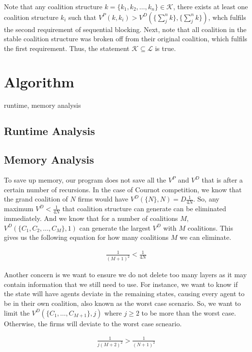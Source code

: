 \documentclass[sigconf,anonymous]{aamas}
\newcommand{\ykc}[1]{{\color{blue} #1}}
\begin{document}
Note that any coalition structure $k=\{k_1, k_2, \dots, k_n\} \in \mathcal{K}$, there exists at least one coalition structure $k_i$ such that $V^P(k, k_i) > V^D(\{\sum_j^n k\}, \{\sum_j^n k\})$, whch fulfils the second requirement of sequential blocking. Next, note that all coalition in the stable coalition structure was broken off from their original coalition, which fulfils the first requirement. Thus, the statement $\mathcal{K} \subseteq \mathcal{L}$ is true. 


\section{Algorithm}

\ykc{runtime, memory analysis}

\subsection{Runtime Analysis}


\subsection{Memory Analysis} 
To save up memory, our program does not save all the $V^P$ and $V^D$ that is after a certain number of recursions. In the case of Cournot competition, we know that the grand coalition of $N$ firms would have $V^D(\{N\}, N) = D\frac{1}{4N}$. So, any maximum $V^D < \frac{1}{4N}$ that coalition structure can generate can be eliminated immediately. And we know that for a number of coalitions $M$, $V^D(\{C_1, C_2, \dots, C_M\}, 1)$ can generate the largest $V^D$ with $M$ coalitions. This gives us the following equation for how many  coalitions $M $ we can eliminate. 

\begin{eqnarray}
	\frac{1}{(M+1)^2}  < \frac{1}{4N}
\end{eqnarray}

Another concern is we want to ensure we do not delete too many layers as it may contain information that we still need to use. For instance, we want to know if the state will have agents deviate in the remaining states, causing every agent to be in their own coalition, also known as the worst case scenario. So, we want to limit the $V^D(\{C_1, \dots, C_{M+1}\}, j)$ where $j \geq 2$ to be more than the worst case. Otherwise, the firms will deviate to the worst case scneario. 

\begin{eqnarray}
	 \frac{1}{j(M+2)^2} > \frac{1}{(N+1)^2}
\end{eqnarray}
\end{document}
